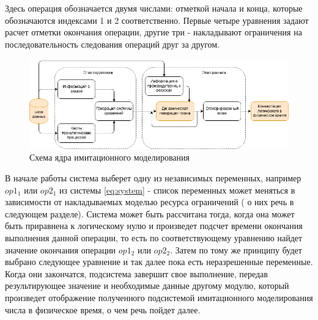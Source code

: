 \indent Здесь операция обозначается двумя числами: отметкой начала и конца, которые обозначаются индексами 1 и 2 соответственно.
Первые четыре уравнения задают расчет отметки окончания операции, другие три - накладывают ограничения на последовательность следования операций друг за другом.

\begin{figure}[ht]
	\centering
	\includegraphics[width=0.7\linewidth]{pics/imcoreDataflow.png}
	\caption{Схема ядра имитационного моделирования}
	\label{fig:imcoreFlow}
\end{figure}

\indent В начале работы система выберет одну из независимых переменных, например $op1_1$ или $op2_1$ из системы \ref{eq:system} - список переменных может меняться в зависимости от накладываемых моделью ресурса ограничений ( о них речь в следующем разделе).
Система может быть рассчитана тогда, когда она может быть приравнена к логическому нулю и произведет подсчет времени окончания выполнения данной операции, то есть по соответствующему уравнению найдет значение окончания операции $op1_2$ или $op2_2$.
Затем по тому же принципу будет выбрано следующее уравнение и так далее пока есть неразрешенные переменные.
Когда они закончатся, подсистема завершит свое выполнение, передав результирующее значение и необходимые данные другому модулю, который произведет отображение полученного подсистемой имитационного моделирования числа в физическое время, о чем речь пойдет далее.